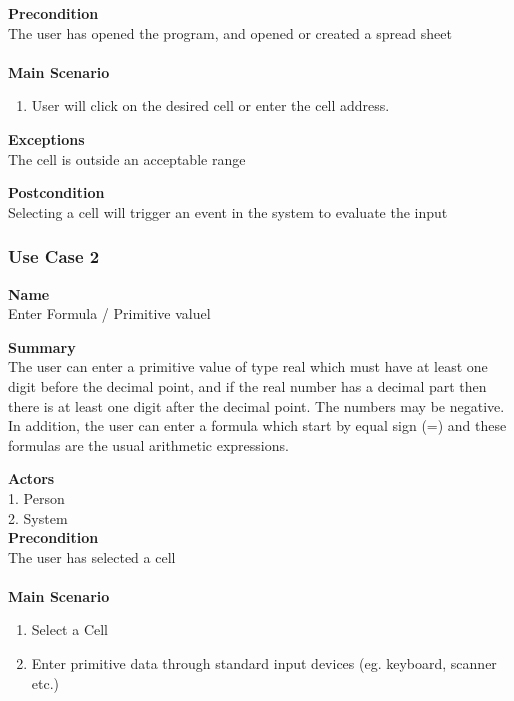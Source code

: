 \documentclass[12pt]{article}
\begin{document}
\noindent
{\bf Precondition}\\
The user has opened the program, and opened or created a spread sheet\\
\noindent\\
{\bf Main Scenario}\\
\vspace*{-0.2in}
\begin{enumerate}
\item User will click on the desired cell or enter the cell address.
\end{enumerate}

\noindent
{\bf Exceptions}\\
The cell is outside an acceptable range

\noindent
{\bf Postcondition}\\
Selecting a cell will trigger an event in the system to evaluate the input

\clearpage

\subsubsection{Use Case 2} \label{uc:2}

\noindent
{\bf Name}\\
Enter Formula / Primitive valuel

\noindent
{\bf Summary}\\
The user can enter a primitive value of type real which must have at least
one digit before the decimal point, and if the real number has a decimal part then there is
at least one digit after the decimal point. The numbers may be negative. In addition, the
user can enter a formula which start by equal sign (=) and these formulas are the usual
arithmetic expressions.

\noindent
{\bf Actors}\\
1. Person\\
2. System\\

\noindent
{\bf Precondition}\\
The user has selected a cell\\
\noindent\\

{\bf Main Scenario}\\
\vspace*{-0.2in}
\begin{enumerate}
\item Select a Cell
\item Enter primitive data through standard input devices (eg. keyboard, scanner etc.)
\end{enumerate}
\end{document}
